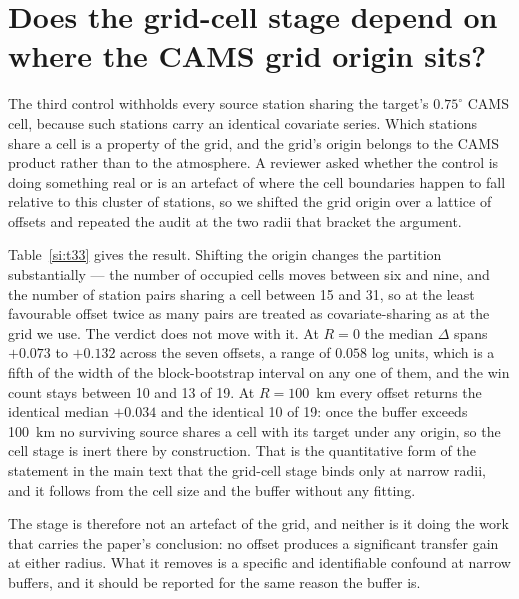 \documentclass[11pt]{article}
\begin{document}
\section{Does the grid-cell stage depend on where the CAMS grid origin sits?}
The third control withholds every source station sharing the target's $0.75^\circ$ CAMS
cell, because such stations carry an identical covariate series. Which stations share a
cell is a property of the grid, and the grid's origin belongs to the CAMS product rather
than to the atmosphere. A reviewer asked whether the control is doing something real or is
an artefact of where the cell boundaries happen to fall relative to this cluster of
stations, so we shifted the grid origin over a lattice of offsets and repeated the audit
at the two radii that bracket the argument.

Table~\ref{si:t33} gives the result. Shifting the origin changes the partition substantially --- the
number of occupied cells moves between six and nine, and the number of station pairs
sharing a cell between 15 and 31, so at the least favourable offset twice as many pairs are
treated as covariate-sharing as at the grid we use. The verdict does not move with it. At
$R=0$ the median $\Delta$ spans $+0.073$ to $+0.132$ across the seven offsets, a range of
$0.058$ log units, which is a fifth of the width of the block-bootstrap interval on any one
of them, and the win count stays between 10 and 13 of 19. At $R=100$~km every offset returns
the identical median $+0.034$ and the identical 10 of 19: once the buffer exceeds 100~km no
surviving source shares a cell with its target under any origin, so the cell stage is inert
there by construction. That is the quantitative form of the statement in the main text that
the grid-cell stage binds only at narrow radii, and it follows from the cell size and the
buffer without any fitting.

The stage is therefore not an artefact of the grid, and neither is it doing the work that
carries the paper's conclusion: no offset produces a significant transfer gain at either
radius. What it removes is a specific and identifiable confound at narrow buffers, and it
should be reported for the same reason the buffer is.
\end{document}
